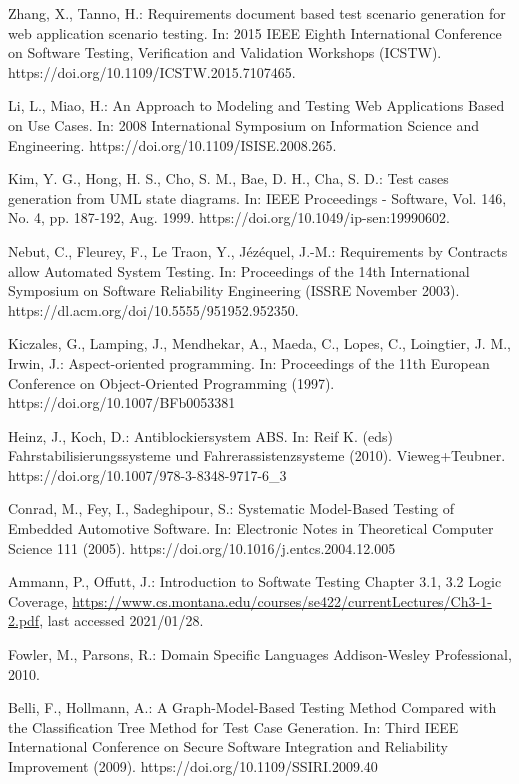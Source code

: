 \documentclass[a4paper,10pt, bibliography=totocnumbered]{scrreprt}
\begin{document}
\begin{thebibliography}{9}
 Zhang, X., Tanno, H.: Requirements document based test scenario generation for web application scenario testing.
In: 2015 IEEE Eighth International Conference on Software Testing, Verification and Validation Workshops (ICSTW).
https://doi.org/10.1109/ICSTW.2015.7107465.

 Li, L., Miao, H.: An Approach to Modeling and Testing Web Applications Based on Use Cases.
In: 2008 International Symposium on Information Science and Engineering.
https://doi.org/10.1109/ISISE.2008.265.

 Kim, Y. G., Hong, H. S., Cho, S. M., Bae, D. H., Cha, S. D.: Test cases generation from UML state diagrams.
In: IEEE Proceedings - Software, Vol. 146, No. 4, pp. 187-192, Aug. 1999.
https://doi.org/10.1049/ip-sen:19990602.

 Nebut, C., Fleurey, F., Le Traon, Y., Jézéquel, J.-M.: Requirements by Contracts allow Automated System Testing.
In: Proceedings of the 14th International Symposium on Software Reliability Engineering (ISSRE November 2003).
https://dl.acm.org/doi/10.5555/951952.952350.


 Kiczales, G., Lamping, J., Mendhekar, A., Maeda, C., Lopes, C., Loingtier, J. M., Irwin, J.: Aspect-oriented programming.
In: Proceedings of the 11th European Conference on Object-Oriented Programming (1997).
https://doi.org/10.1007/BFb0053381

 Heinz, J., Koch, D.: Antiblockiersystem ABS.
In: Reif K. (eds) Fahrstabilisierungssysteme und Fahrerassistenzsysteme (2010). Vieweg+Teubner. 
https://doi.org/10.1007/978-3-8348-9717-6\_3

 Conrad, M., Fey, I., Sadeghipour, S.: Systematic Model-Based Testing of Embedded Automotive Software. 
In: Electronic Notes in Theoretical Computer Science 111 (2005).
https://doi.org/10.1016/j.entcs.2004.12.005

 Ammann, P., Offutt, J.: Introduction to Softwate Testing Chapter 3.1, 3.2 Logic Coverage, \url{https://www.cs.montana.edu/courses/se422/currentLectures/Ch3-1-2.pdf}, last accessed 2021/01/28.

 Fowler, M., Parsons, R.: Domain Specific Languages
Addison-Wesley Professional, 2010.

 Belli, F., Hollmann, A.: A Graph-Model-Based Testing Method Compared with the Classification Tree Method for Test Case Generation.
In: Third IEEE International Conference on Secure Software Integration and Reliability Improvement (2009).
https://doi.org/10.1109/SSIRI.2009.40


\end{thebibliography}
\end{document}
